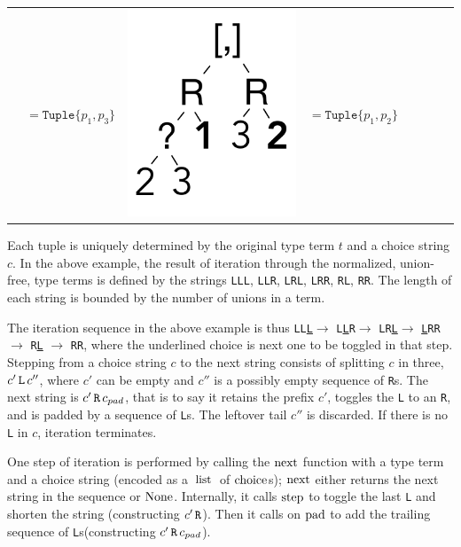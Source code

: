 \documentclass[a4paper,english]{lipics-v2019}
\newcommand{\xt}[1]{\texttt{#1}}
\renewcommand{\L}{{\tt L}\xspace}
\newcommand{\Ls}{{\tt L}s\xspace}
\newcommand{\R}{{\tt R}\xspace}
\newcommand{\uL}{{\underline{\tt L}}\xspace}
\renewcommand{\c}[1]{\ensuremath{\text{\lstinline{#1}}}\xspace}
\newcommand{\tuple}[1]{\xt{Tuple\{}#1\xt{\}}}
\begin{document}
{\begin{tabular}{@{}l@{~}ll@{~}ll@{~}ll@{~}l}
\begin{minipage}{1.2cm}
\end{minipage} &  $ =   \tuple{p_1,p_3} $ 
&\begin{minipage}{1.2cm}\includegraphics[scale=.25]{figures/tree7.pdf} 
\end{minipage} &  $ =   \tuple{p_1,p_2} $ 
\end{tabular}}

\medskip
\noindent 
Each tuple is uniquely determined by the original type term $t$ and a choice
string $c$. In the above example, the result of iteration through the
normalized, union-free, type terms is defined by the strings \L\L\L, \L\L\R,
\L\R\L, \L\R\R, \R\L, \R\R. The length of each string is bounded by the
number of unions in a term.


The iteration sequence in the above example is thus \L\L\uL $\rightarrow$
\L\uL\R $\rightarrow$ \L\R\uL $\rightarrow$ \uL\R\R $\rightarrow$ \R\uL
$\rightarrow$ \R\R, where the underlined choice is next one to be toggled in
that step. Stepping from a choice string $c$ to the next string consists of
splitting $c$ in three, $c' \,\L\,c''$, where $c'$ can be empty and $c''$ is a
possibly empty sequence of {\R}s.  The next string is $c'\, \R \, c_{pad}$,
that is to say it retains the prefix $c'$, toggles the \L to an \R, and is
padded by a sequence of \Ls. The leftover tail $c''$ is discarded. If there is
no \L in $c$, iteration terminates.

One step of iteration is performed by calling the \c{next} function with a
type term and a choice string (encoded as a \c{list} of \c{choice}\hspace{-0.25em}s); \c{next} either returns the next string in
the sequence or \c{None}. Internally, it calls \c{step} to toggle the
last \L and shorten the string (constructing $c'\,\R$). Then it calls on
\c{pad} to add the trailing sequence of \Ls (constructing $c'\,\R\,c_{pad}$).
\end{document}
